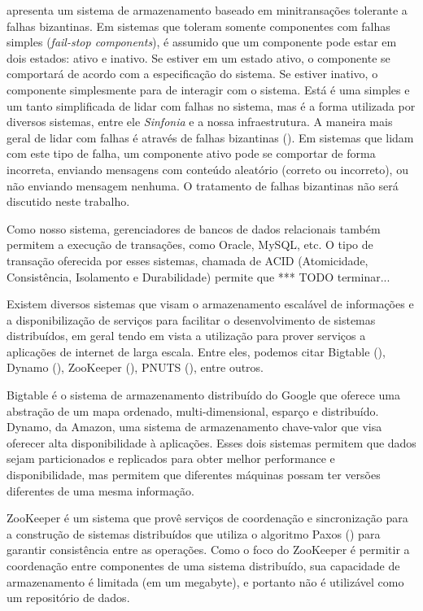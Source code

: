 \documentclass[11pt,twoside,a4paper]{book}
\begin{document}
\cite{padilha} apresenta um sistema de armazenamento baseado em minitransações tolerante a falhas bizantinas. Em sistemas que toleram somente componentes com falhas simples (\emph{fail-stop components}), é assumido que um componente pode estar em dois estados: ativo e inativo. Se estiver em um estado ativo, o componente se comportará de acordo com a especificação do sistema. Se estiver inativo, o componente simplesmente para de interagir com o sistema. Está é uma simples e um tanto simplificada de lidar com falhas no sistema, mas é a forma utilizada por diversos sistemas, entre ele \emph{Sinfonia} e a nossa infraestrutura. A maneira mais geral de lidar com falhas é através de falhas bizantinas (\cite{byzantine}). Em sistemas que lidam com este tipo de falha, um componente ativo pode se comportar de forma incorreta, enviando mensagens com conteúdo aleatório (correto ou incorreto), ou não enviando mensagem nenhuma. O tratamento de falhas bizantinas não será discutido neste trabalho.

Como nosso sistema, gerenciadores de bancos de dados relacionais também permitem a execução de transações, como Oracle, MySQL, etc. O tipo de transação oferecida por esses sistemas, chamada de ACID (Atomicidade, Consistência, Isolamento e Durabilidade) permite que *** TODO terminar...

Existem diversos sistemas que visam o armazenamento escalável de informações e a disponibilização de serviços para facilitar o desenvolvimento de sistemas distribuídos, em geral tendo em vista a utilização para prover serviços a aplicações de internet de larga escala. Entre eles, podemos citar Bigtable (\cite{bigtable}), Dynamo (\cite{dynamo}), ZooKeeper (\cite{zookeeper}), PNUTS (\cite{pnuts}), entre outros. 

Bigtable é o sistema de armazenamento distribuído do Google que oferece uma abstração de um mapa ordenado, multi-dimensional, esparço e distribuído. Dynamo, da Amazon, uma sistema de armazenamento chave-valor que visa oferecer alta disponibilidade à aplicações. Esses dois sistemas permitem que dados sejam particionados e replicados para obter melhor performance e disponibilidade, mas permitem que diferentes máquinas possam ter versões diferentes de uma mesma informação. 

ZooKeeper é um sistema que provê serviços de coordenação e sincronização para a construção de sistemas distribuídos que utiliza o algoritmo Paxos (\cite{paxos}) para garantir consistência entre as operações. Como o foco do ZooKeeper é permitir a coordenação entre componentes de uma sistema distribuído, sua capacidade de armazenamento é limitada (em um megabyte), e portanto não é utilizável como um repositório de dados.
\end{document}
